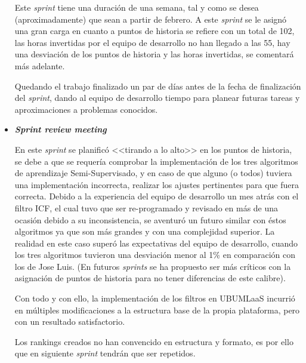 \begin{itemize}
Este \textit{sprint} tiene una duración de una semana, tal y como se desea (aproximadamente) que sean a partir de febrero. A este \textit{sprint} se le asignó una gran carga en cuanto a puntos de historia se refiere con un total de 102, las horas invertidas por el equipo de desarrollo no han llegado a las 55, hay una desviación de los puntos de historia y las horas invertidas, se comentará más adelante.

Quedando el trabajo finalizado un par de días antes de la fecha de finalización del \textit{sprint}, dando al equipo de desarrollo tiempo para planear futuras tareas y aproximaciones a problemas conocidos.

\item \textbf{\textit{Sprint review meeting}}

En este \textit{sprint} se planificó <<tirando a lo alto>> en los puntos de historia, se debe a que se requería comprobar la implementación de los tres algoritmos de aprendizaje Semi-Supervisado, y en caso de que alguno (o todos) tuviera una implementación incorrecta, realizar los ajustes pertinentes para que fuera correcta. Debido a la experiencia del equipo de desarrollo un mes atrás con el filtro ICF, el cual tuvo que ser re-programado y revisado en más de una ocasión debido a su inconsistencia, se aventuró un futuro similar con éstos algoritmos ya que son más grandes y con una complejidad superior. La realidad en este caso superó las expectativas del equipo de desarrollo, cuando los tres algoritmos tuvieron una desviación menor al 1\% en comparación con los de Jose Luis. (En futuros \textit{sprints} se ha propuesto ser más críticos con la asignación de puntos de historia para no tener diferencias de este calibre).

Con todo y con ello, la implementación de los filtros en UBUMLaaS incurrió en múltiples modificaciones a la estructura base de la propia plataforma, pero con un resultado satisfactorio.

Los rankings creados no han convencido en estructura y formato, es por ello que en siguiente \textit{sprint} tendrán que ser repetidos.
\end{itemize}


